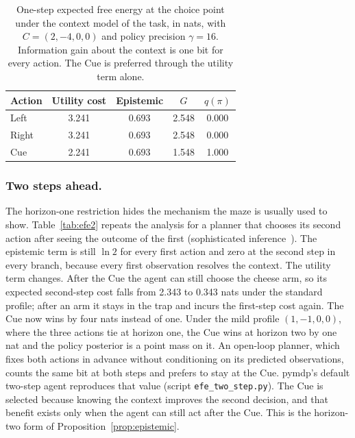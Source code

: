 \documentclass[letterpaper]{article} %
\theoremstyle{definition}
\begin{document}
\begin{table}[t]
\centering
{\small
\begin{tabular}{lcccc}
\hline
\textbf{Action} & \textbf{Utility cost} & \textbf{Epistemic} & $G$ & $q(\pi)$ \\
\hline
Left  & 3.241 & 0.693 & 2.548 & 0.000 \\
Right & 3.241 & 0.693 & 2.548 & 0.000 \\
Cue   & 2.241 & 0.693 & 1.548 & 1.000 \\
\hline
\end{tabular}
}
\caption{One-step expected free energy at the choice point under the context model of the task, in nats, with $C = (2,-4,0,0)$ and policy precision $\gamma = 16$. Information gain about the context is one bit for every action. The Cue is preferred through the utility term alone.}
\label{tab:efe}
\end{table}

\subsubsection{Two steps ahead.}\label{sec:twostep}
The horizon-one restriction hides the mechanism the maze is usually used to show. Table~\ref{tab:efe2} repeats the analysis for a planner that chooses its second action after seeing the outcome of the first (sophisticated inference~\citep{fristonSophisticatedInference2021}). The epistemic term is still $\ln 2$ for every first action and zero at the second step in every branch, because every first observation resolves the context. The utility term changes. After the Cue the agent can still choose the cheese arm, so its expected second-step cost falls from 2.343 to 0.343 nats under the standard profile; after an arm it stays in the trap and incurs the first-step cost again. The Cue now wins by four nats instead of one. Under the mild profile $(1,-1,0,0)$, where the three actions tie at horizon one, the Cue wins at horizon two by one nat and the policy posterior is a point mass on it. An open-loop planner, which fixes both actions in advance without conditioning on its predicted observations, counts the same bit at both steps and prefers to stay at the Cue. pymdp's default two-step agent reproduces that value (script \texttt{efe\_two\_step.py}). The Cue is selected because knowing the context improves the second decision, and that benefit exists only when the agent can still act after the Cue. This is the horizon-two form of Proposition~\ref{prop:epistemic}.
\end{document}
